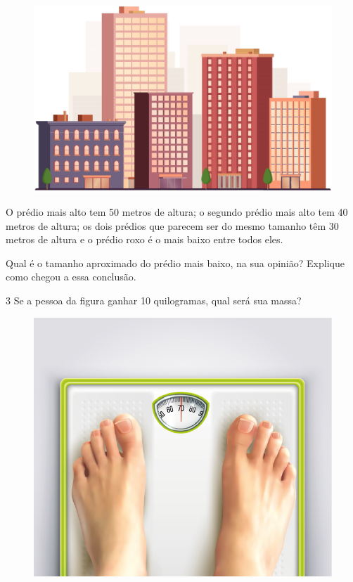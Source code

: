 \begin{figure}[htpb!]
\includegraphics[width=\textwidth]{./media/image31.png}
\end{figure}

O prédio mais alto tem 50 metros de altura; o segundo prédio mais alto
tem 40 metros de altura; os dois prédios que parecem ser do mesmo
tamanho têm 30 metros de altura e o prédio roxo é o mais baixo entre
todos eles.

Qual é o tamanho aproximado do prédio mais baixo, na sua opinião?
Explique como chegou a essa conclusão.

\pagebreak
\num{3} Se a pessoa da figura ganhar 10 quilogramas, qual será sua massa?


\begin{figure}[htpb!]
\centering
\includegraphics[width=.6\textwidth]{./media/image32.png}
\end{figure}

